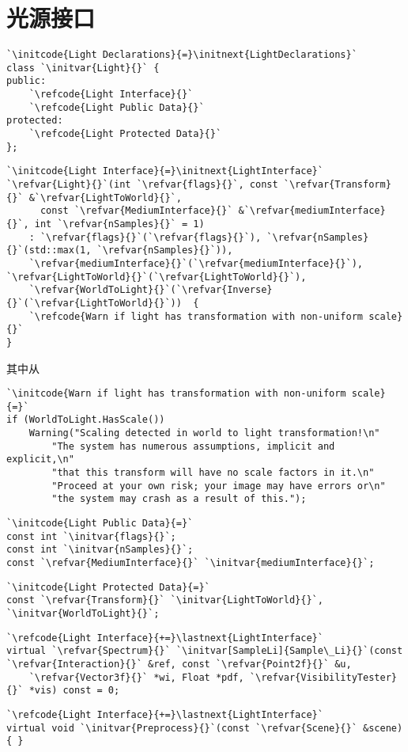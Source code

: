 \section{光源接口}\label{sec:光源接口}

\begin{lstlisting}
`\initcode{Light Declarations}{=}\initnext{LightDeclarations}`
class `\initvar{Light}{}` {
public:
    `\refcode{Light Interface}{}`
    `\refcode{Light Public Data}{}`
protected:
    `\refcode{Light Protected Data}{}`
};
\end{lstlisting}

\begin{lstlisting}
`\initcode{Light Interface}{=}\initnext{LightInterface}`
`\refvar{Light}{}`(int `\refvar{flags}{}`, const `\refvar{Transform}{}` &`\refvar{LightToWorld}{}`,
      const `\refvar{MediumInterface}{}` &`\refvar{mediumInterface}{}`, int `\refvar{nSamples}{}` = 1)
    : `\refvar{flags}{}`(`\refvar{flags}{}`), `\refvar{nSamples}{}`(std::max(1, `\refvar{nSamples}{}`)),
    `\refvar{mediumInterface}{}`(`\refvar{mediumInterface}{}`), `\refvar{LightToWorld}{}`(`\refvar{LightToWorld}{}`),
    `\refvar{WorldToLight}{}`(`\refvar{Inverse}{}`(`\refvar{LightToWorld}{}`))  { 
    `\refcode{Warn if light has transformation with non-uniform scale}{}`
}
\end{lstlisting}
其中从
\begin{lstlisting}
`\initcode{Warn if light has transformation with non-uniform scale}{=}`
if (WorldToLight.HasScale())
    Warning("Scaling detected in world to light transformation!\n"
        "The system has numerous assumptions, implicit and explicit,\n"
        "that this transform will have no scale factors in it.\n"
        "Proceed at your own risk; your image may have errors or\n"
        "the system may crash as a result of this.");
\end{lstlisting}
\begin{lstlisting}
`\initcode{Light Public Data}{=}`
const int `\initvar{flags}{}`;
const int `\initvar{nSamples}{}`;
const `\refvar{MediumInterface}{}` `\initvar{mediumInterface}{}`;
\end{lstlisting}

\begin{lstlisting}
`\initcode{Light Protected Data}{=}`
const `\refvar{Transform}{}` `\initvar{LightToWorld}{}`, `\initvar{WorldToLight}{}`;
\end{lstlisting}
\begin{lstlisting}
`\refcode{Light Interface}{+=}\lastnext{LightInterface}`
virtual `\refvar{Spectrum}{}` `\initvar[SampleLi]{Sample\_Li}{}`(const `\refvar{Interaction}{}` &ref, const `\refvar{Point2f}{}` &u,
    `\refvar{Vector3f}{}` *wi, Float *pdf, `\refvar{VisibilityTester}{}` *vis) const = 0;
\end{lstlisting}
\begin{lstlisting}
`\refcode{Light Interface}{+=}\lastnext{LightInterface}`
virtual void `\initvar{Preprocess}{}`(const `\refvar{Scene}{}` &scene) { }
\end{lstlisting}

